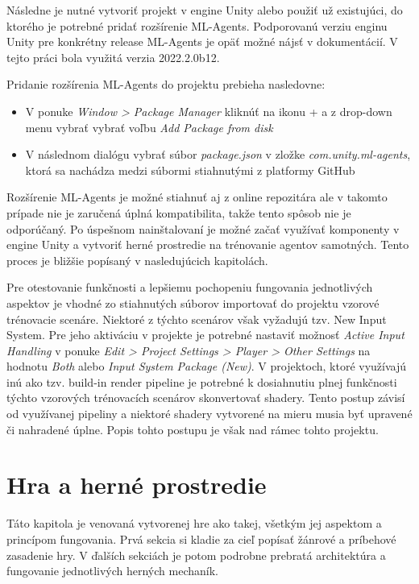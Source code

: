 \documentclass[slovak, master]{diploma}
\begin{document}
Následne je nutné vytvoriť projekt v engine Unity alebo použiť už existujúci, do ktorého je potrebné pridať rozšírenie ML-Agents. Podporovanú verziu enginu Unity pre konkrétny release ML-Agents je opäť možné nájsť v dokumentácií. V tejto práci bola využitá verzia 2022.2.0b12.

Pridanie rozšírenia ML-Agents do projektu prebieha nasledovne: 
\begin{itemize}
  \item V ponuke \textit{Window > Package Manager} kliknúť na ikonu + a z drop-down menu vybrať vybrať voľbu \textit{Add Package from disk}
  \item V následnom dialógu vybrať súbor \textit{package.json} v zložke \textit{com.unity.ml-agents}, ktorá sa nachádza medzi súbormi stiahnutými z platformy GitHub
\end{itemize}

Rozšírenie ML-Agents je možné stiahnuť aj z online repozitára ale v takomto prípade nie je zaručená úplná kompatibilita, takže tento spôsob nie je odporúčaný. Po úspešnom nainštalovaní je možné začať využívať komponenty v engine Unity a vytvoriť herné prostredie na trénovanie agentov samotných. Tento proces je bližšie popísaný v nasledujúcich kapitolách. 

Pre otestovanie funkčnosti a lepšiemu pochopeniu fungovania jednotlivých aspektov je vhodné zo stiahnutých súborov importovať do projektu vzorové trénovacie scenáre. Niektoré z týchto scenárov však vyžadujú tzv. New Input System. Pre jeho aktiváciu v projekte je potrebné nastaviť možnosť \textit{Active Input Handling} v ponuke \textit{Edit > Project Settings > Player > Other Settings} na hodnotu \textit{Both} alebo \textit{Input System Package (New)}. V projektoch, ktoré využívajú inú ako tzv. build-in render pipeline je potrebné k dosiahnutiu plnej funkčnosti týchto vzorových trénovacích scenárov skonvertovať shadery. Tento postup závisí od využívanej pipeliny a niektoré shadery vytvorené na mieru musia byť upravené či nahradené úplne. Popis tohto postupu je však nad rámec tohto projektu.

\chapter{Hra a herné prostredie}
\label{sec:GameOverview}
Táto kapitola je venovaná vytvorenej hre ako takej, všetkým jej aspektom a princípom fungovania. Prvá sekcia si kladie za cieľ popísať žánrové a príbehové zasadenie hry. V ďalších sekciách je potom podrobne prebratá architektúra a fungovanie jednotlivých herných mechaník.
\end{document}
